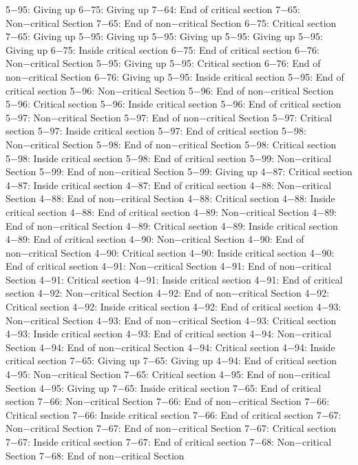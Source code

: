 5−95: Giving up
6−75: Giving up
7−64: End of critical section
7−65: Non−critical Section
7−65: End of non−critical Section
6−75: Critical section
7−65: Giving up
5−95: Giving up
5−95: Giving up
5−95: Giving up
5−95: Giving up
6−75: Inside critical section
6−75: End of critical section
6−76: Non−critical Section
5−95: Giving up
5−95: Critical section
6−76: End of non−critical Section
6−76: Giving up
5−95: Inside critical section
5−95: End of critical section
5−96: Non−critical Section
5−96: End of non−critical Section
5−96: Critical section
5−96: Inside critical section
5−96: End of critical section
5−97: Non−critical Section
5−97: End of non−critical Section
5−97: Critical section
5−97: Inside critical section
5−97: End of critical section
5−98: Non−critical Section
5−98: End of non−critical Section
5−98: Critical section
5−98: Inside critical section
5−98: End of critical section
5−99: Non−critical Section
5−99: End of non−critical Section
5−99: Giving up
4−87: Critical section
4−87: Inside critical section
4−87: End of critical section
4−88: Non−critical Section
4−88: End of non−critical Section
4−88: Critical section
4−88: Inside critical section
4−88: End of critical section
4−89: Non−critical Section
4−89: End of non−critical Section
4−89: Critical section
4−89: Inside critical section
4−89: End of critical section
4−90: Non−critical Section
4−90: End of non−critical Section
4−90: Critical section
4−90: Inside critical section
4−90: End of critical section
4−91: Non−critical Section
4−91: End of non−critical Section
4−91: Critical section
4−91: Inside critical section
4−91: End of critical section
4−92: Non−critical Section
4−92: End of non−critical Section
4−92: Critical section
4−92: Inside critical section
4−92: End of critical section
4−93: Non−critical Section
4−93: End of non−critical Section
4−93: Critical section
4−93: Inside critical section
4−93: End of critical section
4−94: Non−critical Section
4−94: End of non−critical Section
4−94: Critical section
4−94: Inside critical section
7−65: Giving up
7−65: Giving up
4−94: End of critical section
4−95: Non−critical Section
7−65: Critical section
4−95: End of non−critical Section
4−95: Giving up
7−65: Inside critical section
7−65: End of critical section
7−66: Non−critical Section
7−66: End of non−critical Section
7−66: Critical section
7−66: Inside critical section
7−66: End of critical section
7−67: Non−critical Section
7−67: End of non−critical Section
7−67: Critical section
7−67: Inside critical section
7−67: End of critical section
7−68: Non−critical Section
7−68: End of non−critical Section
